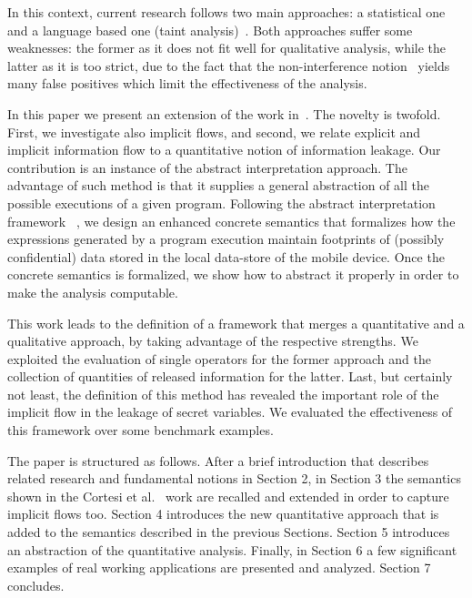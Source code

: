 \documentclass{llncs}
\begin{document}
In this context, current research follows two main approaches: a statistical one~\cite{McCamant06,McCamant08,Lowe02} and a language based one (taint analysis)~\cite{Sridharan11,Tripp14,Tripp09,HS09,SG07,Arzt14}. Both approaches suffer some weaknesses: the former as it does not fit well for qualitative analysis, while the latter as it is too strict, due to the fact that the non-interference notion~\cite{DD76} yields many false positives which limit the effectiveness of the analysis. 

In this paper we present an extension of the work in~\cite{Cortesi15}. The novelty is twofold. First, we investigate also implicit flows, and second, we relate explicit and implicit information flow to a quantitative notion of information leakage. Our contribution is an instance of the abstract interpretation approach. The advantage of such method is that it supplies a general abstraction of all the possible executions of a given program. Following the abstract interpretation framework ~\cite{CousotCousot77-1}, we design an enhanced concrete semantics that formalizes how the expressions generated by a program execution maintain footprints of (possibly confidential) data stored in the local data-store of the mobile device. Once the concrete semantics is formalized, we show how to abstract it properly in order to make the analysis computable.

This work leads to the definition of a framework that merges a quantitative and a qualitative approach, by taking advantage of the respective strengths. We exploited the evaluation of single operators for the former approach and the collection of quantities of released information for the latter. Last, but certainly not least, the definition of this method has revealed the important role of the implicit flow in the leakage of secret variables. We evaluated the effectiveness of this framework over some benchmark examples.

The paper is structured as follows. After a brief introduction that describes related research and fundamental notions in Section 2, in Section 3 the semantics shown in the Cortesi et al.~\cite{Cortesi15} work are recalled and extended in order to capture  implicit flows too. Section 4 introduces the new quantitative approach that is added to the semantics described in the previous Sections.  Section 5 introduces an abstraction of the quantitative analysis.  Finally, in Section 6 a few significant examples of real working applications are presented and analyzed. Section 7 concludes.
\end{document}
